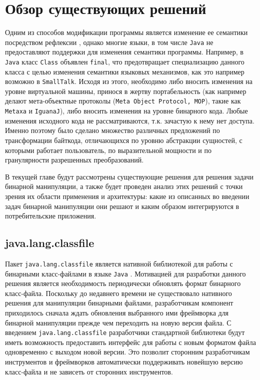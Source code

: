 \section{Обзор существующих решений}
\label{sec:Chapter2} 

\sloppy

Одним из способов модификации программы является изменение ее семантики посредством рефлексии \cite{compReflection}, однако многие языки, в том числе \texttt{Java} не предоставляют поддержки для изменения семантики программы. Например, в \texttt{Java} класс \texttt{Class} объявлен \texttt{final}, что предотвращает специализацию данного класса с целью изменения семантики языковых механизмов, как это например возможно в \texttt{SmallTalk}. Исходя из этого, необходимо либо вносить изменения на уровне виртуальной машины, принося в жертву портабельность (как например делают мета-объектные протоколы (\texttt{Meta~Object~Protocol,~MOP}), такие как \texttt{Metaxa} и \texttt{IguanaJ}), либо вносить изменения на уровне бинарного кода. Любые изменения исходного кода не рассматриваются, т.к. зачастую к нему нет доступа. Именно поэтому было сделано множество различных предложений по трансформации байткода, отличающихся по уровню абстракции сущностей, с которыми работает пользователь, по выразительной мощности и по гранулярности разрешенных преобразований.

В текущей главе будут рассмотрены существующие решения для решения задачи бинарной манипуляции, а также будет проведен анализ этих решений с точки зрения их области применения и архитектуры: какие из описанных во введении задач бинарной манипуляции они решают и каким образом интегрируются в потребительские приложения.

\subsection{java.lang.classfile}

Пакет \texttt{java.lang.classfile} является нативной библиотекой для работы с бинарными класс-файлами в языке \texttt{Java} \cite{lavaLangClassfile}. Мотивацией для разработки данного решения является необходимость периодически обновлять формат бинарного класс-файла. Поскольку до недавнего времени не существовало нативного решения для манипуляции бинарными файлами, разработчикам компонент приходилось сначала ждать обновления выбранного ими фреймворка для бинарной манипуляции прежде чем переходить на новую версия файла. С введением \texttt{java.lang.classfile} разработчики стандартной библиотеки будут иметь возможность предоставить интерфейс для работы с новым форматом файла одновременно с выходом новой версии. Это позволит сторонним разработчикам инструментов и фреймворков автоматически поддерживать новейшую версию класс-файла и не зависеть от сторонних инструментов.

